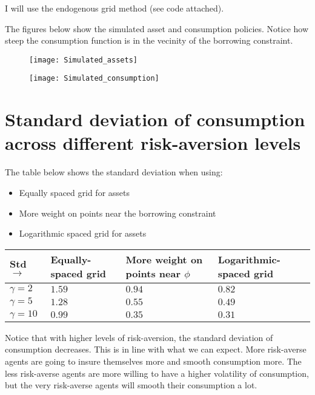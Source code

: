 \documentclass[letter,11pt]{article}
\begin{document}
I will use the endogenous grid method (see code attached).    

The figures below show the simulated asset and consumption policies. Notice how steep the consumption function is in the vecinity of the borrowing constraint.

\begin{figure}[h!]
\centering
\begin{minipage}{.5\textwidth}
  \centering
  \texttt{[image: Simulated\_assets]}
 \end{minipage}%
\begin{minipage}{.5\textwidth}
  \centering
  \texttt{[image: Simulated\_consumption]}
 \end{minipage}
\end{figure}


\section{Standard deviation of consumption across different risk-aversion levels}
\hfill

The table below shows the standard deviation when using:

\begin{itemize}[noitemsep]
\item Equally spaced grid for assets
\item More weight on points near the borrowing constraint
\item Logarithmic spaced grid for assets
\end{itemize}

\begin{tabular}{ l | l | l | l }
  Std $\rightarrow $ & Equally-spaced grid & More weight on points near $\phi$ & Logarithmic-spaced grid \\ \hline
$\gamma=2$ 	& $1.59$ 		& $0.94$ 		& $0.82$ \\
$\gamma=5$  	& $1.28$ 		& $0.55$ 		& $0.49$ \\
 $\gamma=10$ 	& $0.99$ 		& $0.35$ 		& $0.31$ \\ \hline
\end{tabular}

Notice that with higher levels of risk-aversion, the standard deviation of consumption decreases. This is in line with what we can expect. More risk-averse agents are going to insure themselves more and smooth consumption more. The less risk-averse agents are more willing to have a higher volatility of consumption, but the very risk-averse agents will smooth their consumption a lot. 
\end{document}
